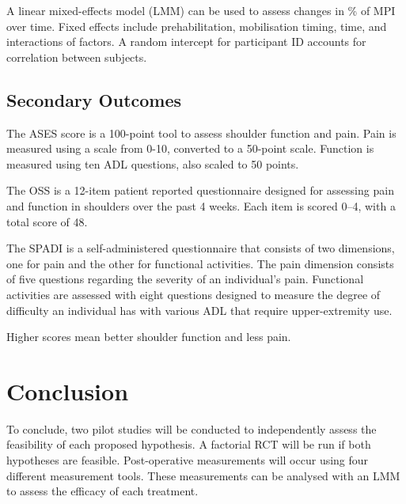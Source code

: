 \documentclass[conference]{IEEEtran}
\begin{document}
A linear mixed-effects model (LMM) can be used to assess changes in \% of MPI over time. Fixed effects include prehabilitation, mobilisation timing, time, and interactions of factors. A random intercept for participant ID accounts for correlation between subjects.

\subsection{Secondary Outcomes}

The ASES score is a 100-point tool to assess shoulder function and pain. Pain is measured using a scale from 0-10, converted to a 50-point scale. Function is measured using ten ADL questions, also scaled to 50 points.

The OSS is a 12-item patient reported questionnaire designed for assessing pain and function in shoulders over the past 4 weeks. Each item is scored 0–4, with a total score of 48.

The SPADI is a self-administered questionnaire that consists of two dimensions, one for pain and the other for functional activities. The pain dimension consists of five questions regarding the severity of an individual's pain. Functional activities are assessed with eight questions designed to measure the degree of difficulty an individual has with various ADL that require upper-extremity use.

Higher scores mean better shoulder function and less pain.

\section{Conclusion}
To conclude, two pilot studies will be conducted to independently assess the feasibility of each proposed hypothesis. A factorial RCT will be run if both hypotheses are feasible. Post-operative measurements will occur using four different measurement tools. These measurements can be analysed with an LMM to assess the efficacy of each treatment.


%  
\end{document}
